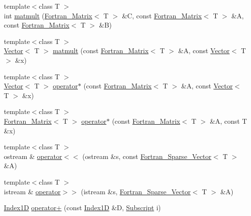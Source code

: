 \begin{DoxyCompactItemize}
\item 
{\footnotesize template$<$class T $>$ }\\int \hyperlink{namespace_t_n_t_a603d46a16ecb0ccccaac5909d63f1e2d}{matmult} (\hyperlink{class_t_n_t_1_1_fortran___matrix}{Fortran\_\-Matrix}$<$ T $>$ \&C, const \hyperlink{class_t_n_t_1_1_fortran___matrix}{Fortran\_\-Matrix}$<$ T $>$ \&A, const \hyperlink{class_t_n_t_1_1_fortran___matrix}{Fortran\_\-Matrix}$<$ T $>$ \&B)
\item 
{\footnotesize template$<$class T $>$ }\\\hyperlink{class_t_n_t_1_1_vector}{Vector}$<$ T $>$ \hyperlink{namespace_t_n_t_abfedcbc5eb6e7f5fe9389fa06db6a588}{matmult} (const \hyperlink{class_t_n_t_1_1_fortran___matrix}{Fortran\_\-Matrix}$<$ T $>$ \&A, const \hyperlink{class_t_n_t_1_1_vector}{Vector}$<$ T $>$ \&x)
\item 
{\footnotesize template$<$class T $>$ }\\\hyperlink{class_t_n_t_1_1_vector}{Vector}$<$ T $>$ \hyperlink{namespace_t_n_t_aac8a2989bb0283dc4d0ccf3fe883f8be}{operator$\ast$} (const \hyperlink{class_t_n_t_1_1_fortran___matrix}{Fortran\_\-Matrix}$<$ T $>$ \&A, const \hyperlink{class_t_n_t_1_1_vector}{Vector}$<$ T $>$ \&x)
\item 
{\footnotesize template$<$class T $>$ }\\\hyperlink{class_t_n_t_1_1_fortran___matrix}{Fortran\_\-Matrix}$<$ T $>$ \hyperlink{namespace_t_n_t_a7612f5b6ad37e9a0537ddfcaa738b64a}{operator$\ast$} (const \hyperlink{class_t_n_t_1_1_fortran___matrix}{Fortran\_\-Matrix}$<$ T $>$ \&A, const T \&x)
\item 
{\footnotesize template$<$class T $>$ }\\ostream \& \hyperlink{namespace_t_n_t_a88482da0390ee1f30e10c427bebc365a}{operator$<$$<$} (ostream \&s, const \hyperlink{class_t_n_t_1_1_fortran___sparse___vector}{Fortran\_\-Sparse\_\-Vector}$<$ T $>$ \&A)
\item 
{\footnotesize template$<$class T $>$ }\\istream \& \hyperlink{namespace_t_n_t_a9de7ed1e5e9ece787ad2681d7f51097a}{operator$>$$>$} (istream \&s, \hyperlink{class_t_n_t_1_1_fortran___sparse___vector}{Fortran\_\-Sparse\_\-Vector}$<$ T $>$ \&A)
\item 
\hyperlink{class_t_n_t_1_1_index1_d}{Index1D} \hyperlink{namespace_t_n_t_a51b24ce5ffa283f99de3d7272a5578b5}{operator+} (const \hyperlink{class_t_n_t_1_1_index1_d}{Index1D} \&D, \hyperlink{namespace_t_n_t_af22e3f1460e145c04ce4e7d701e4c1c1}{Subscript} i)
\item 

\end{DoxyCompactItemize}
